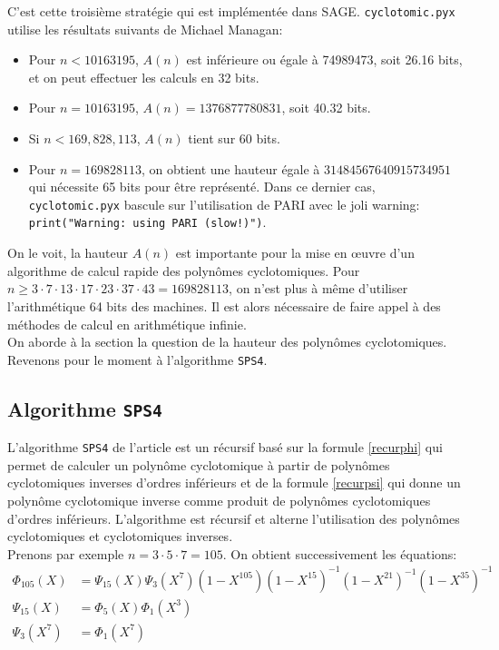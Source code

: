 \documentclass{article}
\newcounter{question}
\theoremstyle{break}                  %
\begin{document}
C'est cette troisième stratégie qui est implémentée dans SAGE. \texttt{cyclotomic.pyx} utilise les résultats suivants de Michael Managan:
\begin{itemize}
	\item Pour $n<10163195$, $A(n)$ est inférieure ou égale à 74989473, soit 26.16 bits, et on peut effectuer les calculs en 32 bits.
	\item Pour $n=10163195$, $A(n)=1376877780831$,  soit 40.32 bits.
	\item Si $n < 169,828,113$, $A(n)$ tient sur 60 bits.
	\item Pour $n = 169828113$, on obtient une hauteur égale à $31484567640915734951$ qui nécessite 65 bits pour être représenté. Dans ce dernier cas, \texttt{cyclotomic.pyx} bascule sur l'utilisation de PARI avec le joli warning: \texttt{print("Warning: using PARI (slow!)")}.\\
\end{itemize}

On le voit, la hauteur $A(n)$ est importante pour la mise en œuvre d'un algorithme de calcul rapide des polynômes cyclotomiques. Pour $n \ge 3 \cdot 7 \cdot 13 \cdot 17 \cdot 23 \cdot 37 \cdot 43 = 169828113$, on n'est plus à même d'utiliser l'arithmétique 64 bits des machines. Il est alors nécessaire de faire appel à des méthodes de calcul en arithmétique infinie.\\

On aborde à la section  la question de la hauteur des polynômes cyclotomiques. Revenons pour le moment à l'algorithme \texttt{SPS4}.

\subsection*{Algorithme \texttt{SPS4}}
L'algorithme \texttt{SPS4} de l'article est un récursif basé sur la formule \ref{recurphi} qui permet de calculer un polynôme cyclotomique à partir de polynômes cyclotomiques inverses d'ordres inférieurs et de la formule \ref{recurpsi} qui donne un polynôme cyclotomique inverse comme produit de polynômes cyclotomiques d'ordres inférieurs. L'algorithme est récursif et alterne l'utilisation des polynômes cyclotomiques et cyclotomiques inverses.\\

Prenons par exemple $n = 3 \cdot 5 \cdot 7 = 105$. On obtient successivement les équations:
\begin{align*}
	\Phi_{105}(X) &= \Psi_{15}(X)\Psi_{3}(X^7)(1-X^{105})(1-X^{15})^{-1}(1-X^{21})^{-1}(1-X^{35})^{-1}\\
	\Psi_{15}(X) &= \Phi_{5}(X) \Phi_{1}(X^3)\\
	\Psi_{3}(X^7) &= \Phi_{1}(X^7) 
\end{align*}
\end{document}
